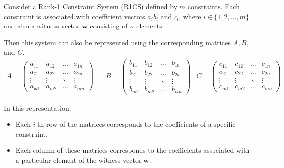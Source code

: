 \documentclass[../lecture-notes.tex]{subfiles}
\begin{document}
\begin{definition} 
    Consider a Rank-1 Constraint System (R1CS) defined by $m$ constraints. Each constraint is
    associated with coefficient vectors $a_i b_i$ and $c_i$, where $i \in \{1, 2, \dots, m\}$ and
    also a witness vector $\mathbf{w}$ consisting of $n$ elements.

    Then this system can also be represented using the corresponding matrices $A, B,$ and $C$.
    \begin{align*}
        A = \begin{pmatrix}
            a_{11} & a_{12} & \dots & a_{1n} \\
            a_{21} & a_{22} & \dots & a_{2n} \\
            \vdots & \vdots & \ddots & \vdots \\
            a_{m1} & a_{m2} & \dots & a_{mn}
        \end{pmatrix} & \quad
        B = \begin{pmatrix}
            b_{11} & b_{12} & \dots & b_{1n} \\
            b_{21} & b_{22} & \dots & b_{2n} \\
            \vdots & \vdots & \ddots & \vdots \\
            b_{m1} & b_{m2} & \dots & b_{mn}
        \end{pmatrix} & 
        C = \begin{pmatrix}
            c_{11} & c_{12} & \dots & c_{1n} \\
            c_{21} & c_{22} & \dots & c_{2n} \\
            \vdots & \vdots & \ddots & \vdots \\
            c_{m1} & c_{m2} & \dots & c_{mn}
        \end{pmatrix}
    \end{align*}
    
    In this representation:
    \begin{itemize}
        \item Each $i$-th row of the matrices corresponds to the coefficients of a specific constraint.
        \item Each column of these matrices corresponds to the coefficients associated with a 
        particular element of the witness vector $\mathbf{w}$.
    \end{itemize}
\end{definition}
\end{document}
